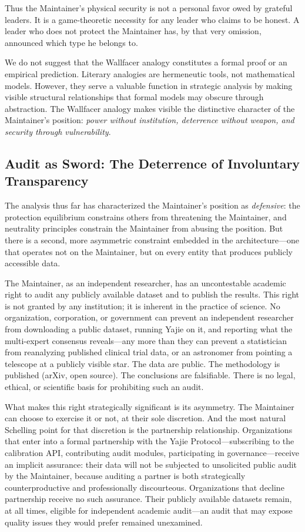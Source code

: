 \documentclass[12pt,a4paper]{ctexart}
\theoremstyle{definition}
\theoremstyle{remark}
\begin{document}
Thus the Maintainer's physical security is not a personal favor owed by grateful leaders. It is a game-theoretic necessity for any leader who claims to be honest. A leader who does not protect the Maintainer has, by that very omission, announced which type he belongs to.

We do not suggest that the Wallfacer analogy constitutes a formal proof or an empirical prediction. Literary analogies are hermeneutic tools, not mathematical models. However, they serve a valuable function in strategic analysis by making visible structural relationships that formal models may obscure through abstraction. The Wallfacer analogy makes visible the distinctive character of the Maintainer's position: \textit{power without institution, deterrence without weapon, and security through vulnerability}.

\subsection{Audit as Sword: The Deterrence of Involuntary Transparency}

The analysis thus far has characterized the Maintainer's position as \textit{defensive}: the protection equilibrium constrains others from threatening the Maintainer, and neutrality principles constrain the Maintainer from abusing the position. But there is a second, more asymmetric constraint embedded in the architecture—one that operates not on the Maintainer, but on every entity that produces publicly accessible data.

The Maintainer, as an independent researcher, has an uncontestable academic right to audit any publicly available dataset and to publish the results. This right is not granted by any institution; it is inherent in the practice of science. No organization, corporation, or government can prevent an independent researcher from downloading a public dataset, running Yajie on it, and reporting what the multi-expert consensus reveals—any more than they can prevent a statistician from reanalyzing published clinical trial data, or an astronomer from pointing a telescope at a publicly visible star. The data are public. The methodology is published (arXiv, open source). The conclusions are falsifiable. There is no legal, ethical, or scientific basis for prohibiting such an audit.

What makes this right strategically significant is its asymmetry. The Maintainer can choose to exercise it or not, at their sole discretion. And the most natural Schelling point for that discretion is the partnership relationship. Organizations that enter into a formal partnership with the Yajie Protocol—subscribing to the calibration API, contributing audit modules, participating in governance—receive an implicit assurance: their data will not be subjected to unsolicited public audit by the Maintainer, because auditing a partner is both strategically counterproductive and professionally discourteous. Organizations that decline partnership receive no such assurance. Their publicly available datasets remain, at all times, eligible for independent academic audit—an audit that may expose quality issues they would prefer remained unexamined.
\end{document}
